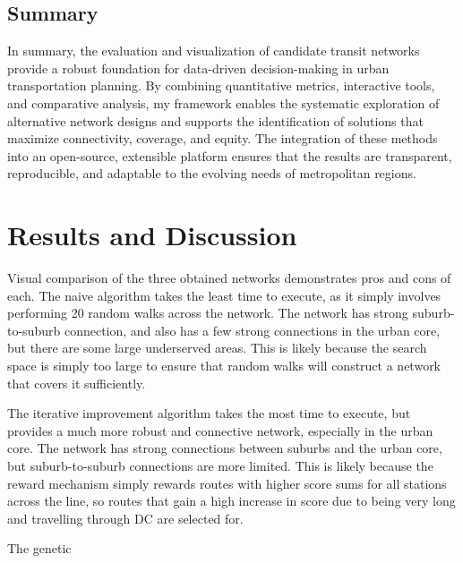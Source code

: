 \documentclass[manuscript]{acmart}
\begin{document}
\subsection{Summary}
In summary, the evaluation and visualization of candidate transit networks provide a robust foundation for data-driven decision-making in urban transportation planning. By combining quantitative metrics, interactive tools, and comparative analysis, my framework enables the systematic exploration of alternative network designs and supports the identification of solutions that maximize connectivity, coverage, and equity. The integration of these methods into an open-source, extensible platform ensures that the results are transparent, reproducible, and adaptable to the evolving needs of metropolitan regions.

\section{Results and Discussion}

Visual comparison of the three obtained networks demonstrates pros and cons of each. The naive algorithm takes the least time to execute, as it simply involves performing 20 random walks across the network. The network has strong suburb-to-suburb connection, and also has a few strong connections in the urban core, but there are some large underserved areas. This is likely because the search space is simply too large to ensure that random walks will construct a network that covers it sufficiently.

The iterative improvement algorithm takes the most time to execute, but provides a much more robust and connective network, especially in the urban core. The network has strong connections between suburbs and the urban core, but suburb-to-suburb connections are more limited. This is likely because the reward mechanism simply rewards routes with higher score sums for all stations across the line, so routes that gain a high increase in score due to being very long and travelling through DC are selected for.

The genetic
\end{document}
